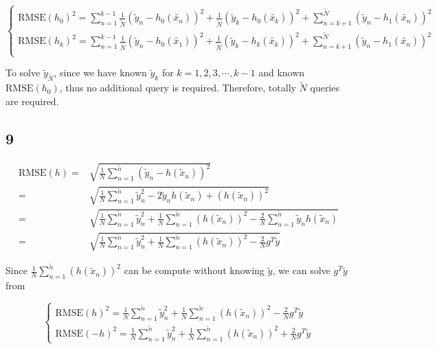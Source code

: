 \documentclass[fleqn,a4paper,12pt]{article}
\begin{document}
\[
\begin{cases}
  \mathrm{RMSE}(h_0)^2 = \sum_{n=1}^{k-1} \frac{1}{\tilde{N}} (\tilde{y}_n - h_0(\tilde{x_n}))^2 + \frac{1}{\tilde{N}} (\tilde{y}_k - h_0(\tilde{x_k}))^2 + \sum_{n=k+1}^{\tilde{N}} (\tilde{y}_n - h_1(\tilde{x_n}))^2 \\
  \mathrm{RMSE}(h_k)^2 = \sum_{n=1}^{k-1} \frac{1}{\tilde{N}} (\tilde{y}_n - h_0(\tilde{x_1}))^2  + \frac{1}{\tilde{N}} (\tilde{y}_k - h_k(\tilde{x_k}))^2 + \sum_{n=k+1}^{\tilde{N}} (\tilde{y}_n - h_1(\tilde{x_n}))^2 \\
\end{cases}
\]


To solve $\tilde{y}_{\tilde{N}}$, since we have known $\tilde{y}_k$ for $k=1, 2, 3, \cdots, k - 1$ and known $\mathrm{RMSE}(h_0)$, thus no additional query is required. Therefore, totally $\tilde{N}$ queries are required.

\subsection*{9}

\begin{align*}
  \mathrm{RMSE}(h)
  =& \sqrt{\frac{1}{N} \sum_{n=1}^{\tilde{n}} (\tilde{y}_n - h(\tilde{x}_n))^2} \\
  =& \sqrt{\frac{1}{N} \sum_{n=1}^{\tilde{n}} \tilde{y}_n^2 - 2 \tilde{y}_n h(\tilde{x}_n) + (h(\tilde{x}_n))^2} \\
  =& \sqrt{\frac{1}{N} \sum_{n=1}^{\tilde{n}} \tilde{y}_n^2 + \frac{1}{N} \sum_{n=1}^{\tilde{n}} (h(\tilde{x}_n))^2  - \frac{2}{N} \sum_{n=1}^{\tilde{n}} \tilde{y}_n h(\tilde{x}_n) } \\
  =& \sqrt{\frac{1}{N} \sum_{n=1}^{\tilde{n}} \tilde{y}_n^2 + \frac{1}{N} \sum_{n=1}^{\tilde{n}} (h(\tilde{x}_n))^2  - \frac{2}{N} g^T \tilde{y} }
\end{align*}

Since $\frac{1}{N} \sum_{n=1}^{\tilde{n}} (h(\tilde{x}_n))^2$ can be compute without knowing $\tilde{y}$, we can solve $g^T \tilde{y}$ from 

\[
  \begin{cases}
    \mathrm{RMSE}(h)^2 = \frac{1}{N} \sum_{n=1}^{\tilde{n}} \tilde{y}_n^2 + \frac{1}{N} \sum_{n=1}^{\tilde{n}} (h(\tilde{x}_n))^2  - \frac{2}{N} g^T \tilde{y}  \\
    \mathrm{RMSE}(-h)^2 = \frac{1}{N} \sum_{n=1}^{\tilde{n}} \tilde{y}_n^2 + \frac{1}{N} \sum_{n=1}^{\tilde{n}} (h(\tilde{x}_n))^2  + \frac{2}{N} g^T \tilde{y}  
  \end{cases}
\]
\end{document}
